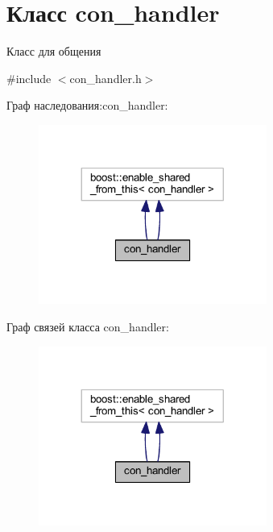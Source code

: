 \hypertarget{classcon__handler}{}\section{Класс con\+\_\+handler}
\label{classcon__handler}


Класс для общения  




{\ttfamily \#include $<$con\+\_\+handler.\+h$>$}



Граф наследования\+:con\+\_\+handler\+:\nopagebreak
\begin{figure}[H]
\begin{center}
\leavevmode
\includegraphics[width=212pt]{classcon__handler__inherit__graph}
\end{center}
\end{figure}


Граф связей класса con\+\_\+handler\+:\nopagebreak
\begin{figure}[H]
\begin{center}
\leavevmode
\includegraphics[width=212pt]{classcon__handler__coll__graph}
\end{center}
\end{figure}
